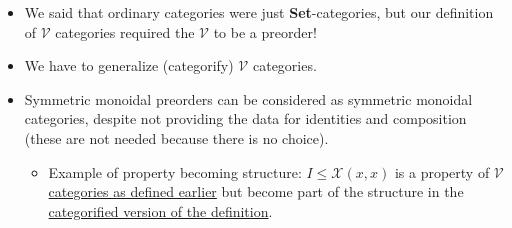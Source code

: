 \begin{itemize}
    \item We said that ordinary categories were just \textbf{Set}-categories, but our definition of $\mathcal{V}$ categories required the $\mathcal{V}$ to be a preorder!
    \item We have to generalize (categorify) $\mathcal{V}$ categories.
    \item Symmetric monoidal preorders can be considered as symmetric monoidal categories, despite not providing the data for identities and composition (these are not needed because there is no choice).
          \begin{itemize}
            \item Example of property becoming structure: $I \leq \mathcal{X}(x,x)$ is a property of $\mathcal{V}$ \href{doc/1 math/Seven Sketches in Compositionality/Chapter 2: Resource theories/3 Enrichment/1 V-categories/1 V-category}{categories as defined earlier} but become part of the structure in the \href{doc/1 math/Seven Sketches in Compositionality/Chapter 4: Co-design/4 Categorification/4 Categories enriched in a symmetric monoidal category/1 Enrichment in a SMC}{categorified version of the definition}.
          \end{itemize}

  \end{itemize}
